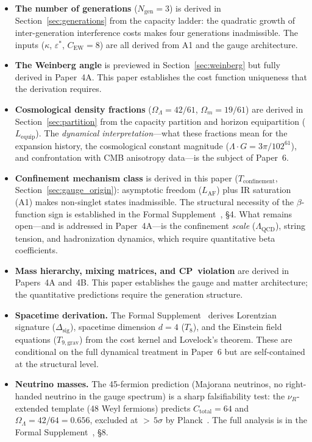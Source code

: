 \documentclass[11pt]{article}
\newenvironment{varlist}{\begin{itemize}[nosep,leftmargin=2em]}{\end{itemize}}
\begin{document}
\begin{varlist}
\item \textbf{The number of generations} ($N_{\mathrm{gen}} = 3$) is derived in Section~\ref{sec:generations} from the capacity ladder: the quadratic growth of inter-generation interference costs makes four generations inadmissible.  The inputs ($\kappa$, $\varepsilon^*$, $C_{\mathrm{EW}} = 8$) are all derived from A1 and the gauge architecture.
\item \textbf{The Weinberg angle} is previewed in Section~\ref{sec:weinberg} but fully derived in Paper~4A.  This paper establishes the cost function uniqueness that the derivation requires.
\item \textbf{Cosmological density fractions} ($\Omega_\Lambda = 42/61$, $\Omega_m = 19/61$) are derived in Section~\ref{sec:partition} from the capacity partition and horizon equipartition ($L_{\mathrm{equip}}$).  The \emph{dynamical interpretation}---what these fractions mean for the expansion history, the cosmological constant magnitude ($\Lambda \cdot G = 3\pi/102^{61}$), and confrontation with CMB anisotropy data---is the subject of Paper~6.
\item \textbf{Confinement mechanism class} is derived in this paper ($T_{\mathrm{confinement}}$, Section~\ref{sec:gauge_origin}): asymptotic freedom ($L_{\mathrm{AF}}$) plus IR saturation (A1) makes non-singlet states inadmissible.  The structural necessity of the $\beta$-function sign is established in the Formal Supplement~\cite{BrookeP2Supplement}, \S4.  What remains open---and is addressed in Paper~4A---is the confinement \emph{scale} ($\Lambda_{\mathrm{QCD}}$), string tension, and hadronization dynamics, which require quantitative beta coefficients.
\item \textbf{Mass hierarchy, mixing matrices, and CP~violation} are derived in Papers~4A and~4B.  This paper establishes the gauge and matter architecture; the quantitative predictions require the generation structure.
\item \textbf{Spacetime derivation.}  The Formal Supplement~\cite{BrookeP2Supplement} derives Lorentzian signature ($\Delta_{\mathrm{sig}}$), spacetime dimension $d = 4$ ($T_8$), and the Einstein field equations ($T_{9,\mathrm{grav}}$) from the cost kernel and Lovelock's theorem.  These are conditional on the full dynamical treatment in Paper~6 but are self-contained at the structural level.
\item \textbf{Neutrino masses.}  The 45-fermion prediction (Majorana neutrinos, no right-handed neutrino in the gauge spectrum) is a sharp falsifiability test: the $\nu_R$-extended template (48 Weyl fermions) predicts $C_{\mathrm{total}} = 64$ and $\Omega_\Lambda = 42/64 = 0.656$, excluded at ${>}\,5\sigma$ by Planck~\cite{Planck2020}.  The full analysis is in the Formal Supplement~\cite{BrookeP2Supplement}, \S8.
\end{varlist}
\end{document}
